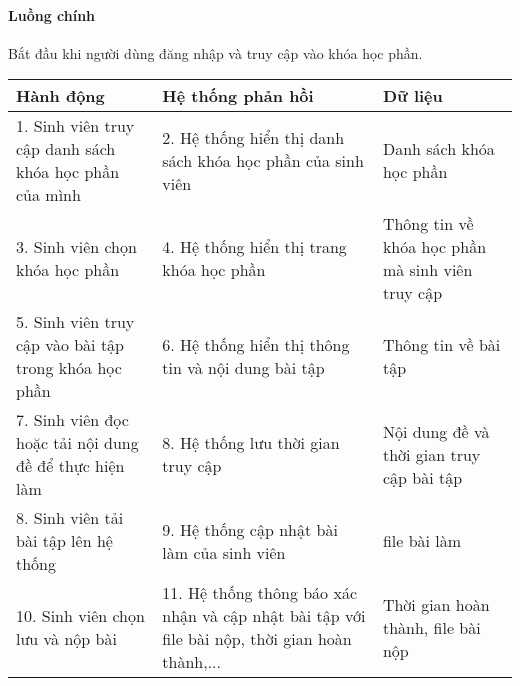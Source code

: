 \documentclass[./../main_file.tex]{subfiles}
\begin{document}
\paragraph{Luồng chính}
Bắt đầu khi người dùng đăng nhập và truy cập vào khóa học phần.
\begin{table}[H]
				\begin{tabular}{|p{.33\textwidth}|p{}|p{}|}
		\hline
		\textbf{Hành động}                                     & \textbf{Hệ thống phản hồi}                                & \textbf{Dữ liệu}                                \\ \hline
		1. Sinh viên truy cập danh sách khóa học phần của mình  & 2. Hệ thống hiển thị danh sách khóa học phần của sinh viên & Danh sách khóa học phần                          \\ \hline
		3. Sinh viên chọn khóa học phần                         & 4.  Hệ thống hiển thị trang khóa học phần                  & Thông tin về khóa học phần mà sinh viên truy cập \\ \hline
		5. Sinh viên truy cập vào bài tập trong khóa học phần   & 6. Hệ thống hiển thị thông tin và nội dung bài tập        & Thông tin về bài tập                            \\ \hline
		7. Sinh viên đọc hoặc tải nội dung đề để thực hiện làm & 8. Hệ thống lưu thời gian truy cập                        & Nội dung đề và thời gian truy cập bài tập       \\ \hline
		8. Sinh viên tải bài tập lên hệ thống                  & 9. Hệ thống cập nhật bài làm của sinh viên                & file bài làm                                    \\ \hline
		10. Sinh viên chọn lưu và nộp bài & 11. Hệ thống thông báo xác nhận và cập nhật bài tập với file bài nộp, thời gian hoàn thành,... & Thời gian hoàn thành, file bài nộp \\ \hline
	\end{tabular}
\end{table}
\end{document}
